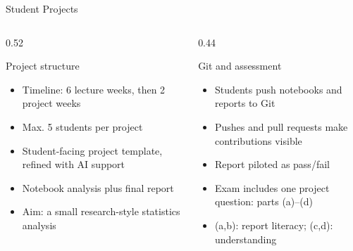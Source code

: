 \documentclass[aspectratio=169,11pt]{beamer}
\begin{document}
\begin{frame}{Student Projects}
  \small
  \begin{columns}[T,totalwidth=\textwidth]
    \begin{column}{0.52\textwidth}
      \begin{block}{Project structure}
        \begin{itemize}
          \item Timeline: 6 lecture weeks, then 2 project weeks
          \item Max. 5 students per project
          \item Student-facing project template, refined with AI support
          \item Notebook analysis plus final report
          \item Aim: a small research-style statistics analysis
        \end{itemize}
      \end{block}
    \end{column}
    \begin{column}{0.44\textwidth}
      \begin{block}{Git and assessment}
        \begin{itemize}
          \item Students push notebooks and reports to Git
          \item Pushes and pull requests make contributions visible
          \item Report piloted as pass/fail
          \item Exam includes one project question: parts (a)--(d)
          \item (a,b): report literacy; (c,d): understanding
        \end{itemize}
      \end{block}
    \end{column}
  \end{columns}
\end{frame}
\end{document}
